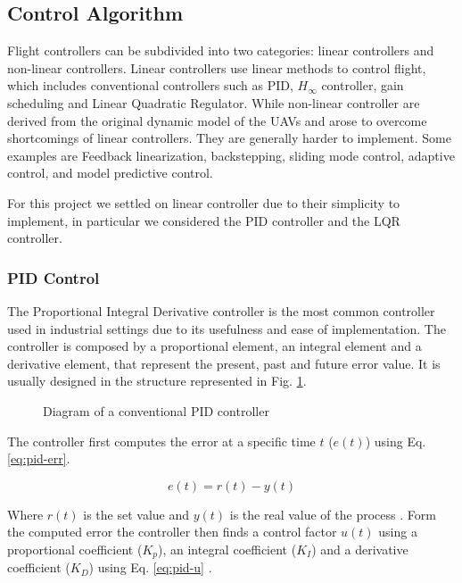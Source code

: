 \subsection{Control Algorithm}

Flight controllers can be subdivided into two categories: linear controllers and non-linear controllers.
Linear controllers use linear methods to control flight, which includes conventional controllers such as
PID, $H_{\infty}$ controller, gain scheduling and Linear Quadratic Regulator. While non-linear controller
are derived from the original dynamic model of the UAVs and arose to overcome shortcomings of linear
controllers. They are generally harder to implement. Some examples are Feedback linearization, backstepping,
sliding mode control, adaptive control, and model predictive control. \autocite{NH20}

For this project we settled on linear controller due to their simplicity to implement, in particular
we considered the PID controller and the LQR controller.

\subsubsection{PID Control}

The Proportional Integral Derivative controller is the most common controller used in industrial settings
due to its usefulness and ease of implementation. \autocite{IL23} The controller is composed by a proportional
element, an integral element and a derivative element, that represent the present, past and future error value\autocite{AM09}. It is usually designed in the structure represented in Fig. \ref{fig:pid}.

\newpage

\begin{figure}
	\begin{center}
		
	\end{center}
	\caption{Diagram of a conventional PID controller}\label{fig:pid}
\end{figure}

The controller first computes the error at a specific time $t$ ($e(t)$) using Eq. \ref{eq:pid-err}.

\begin{equation}
	e(t) = r(t) - y(t)
	\label{eq:pid-err}
\end{equation}

Where $r(t)$ is the set value and $y(t)$ is the real value of the process \autocite{AM09}. 
Form the computed error the controller then finds a control factor $u(t)$ using a proportional
coefficient ($K_p$), an integral coefficient ($K_I$) and a derivative coefficient ($K_D$) 
using Eq. \ref{eq:pid-u} \autocite{NH20}.

